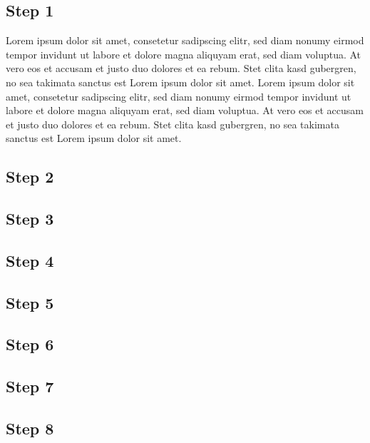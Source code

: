 \documentclass[a4paper, nobind]{templates/ociamthesis}
\begin{document}
\hypertarget{step-1}{%
\subsection{Step 1}\label{step-1}}

Lorem ipsum dolor sit amet, consetetur sadipscing elitr, sed diam nonumy eirmod tempor invidunt ut labore et dolore magna aliquyam erat, sed diam voluptua. At vero eos et accusam et justo duo dolores et ea rebum. Stet clita kasd gubergren, no sea takimata sanctus est Lorem ipsum dolor sit amet. Lorem ipsum dolor sit amet, consetetur sadipscing elitr, sed diam nonumy eirmod tempor invidunt ut labore et dolore magna aliquyam erat, sed diam voluptua. At vero eos et accusam et justo duo dolores et ea rebum. Stet clita kasd gubergren, no sea takimata sanctus est Lorem ipsum dolor sit amet.

\hypertarget{step-2}{%
\subsection{Step 2}\label{step-2}}

\hypertarget{step-3}{%
\subsection{Step 3}\label{step-3}}

\hypertarget{step-4}{%
\subsection{Step 4}\label{step-4}}

\hypertarget{step-5}{%
\subsection{Step 5}\label{step-5}}

\hypertarget{step-6}{%
\subsection{Step 6}\label{step-6}}

\hypertarget{step-7}{%
\subsection{Step 7}\label{step-7}}

\hypertarget{step-8}{%
\subsection{Step 8}\label{step-8}}
\end{document}

